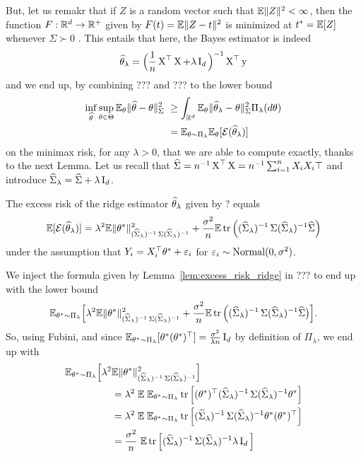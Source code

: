 But, let us remakr that if $Z$ is a random vector such that $\mathbb E \| Z \|^2 < \infty$, then the function $F : \mathbb R^d \rightarrow \mathbb R^+$ given by $F(t) = \mathbb E \| Z - t \|^2$ is minimized at $t^* = \mathbb E[Z]$ whenever $\Sigma \succ 0$
.
This entails that here, the Bayes estimator is indeed
\begin{equation*}
	\widehat \theta_\lambda = \Big( \frac 1n \operatorname{{\boldsymbol X}}^\top \operatorname{{\boldsymbol X}} + \lambda \operatorname{{\boldsymbol I}}_d\Big)^{-1} \operatorname{{\boldsymbol X}}^\top \operatorname{{\boldsymbol y}}
\end{equation*}
and we end up, by combining ??? and ??? to the lower bound 
\begin{align*}
	\inf_{\wh \theta} \sup_{\theta \in \Theta} \E_\theta \norm{\wh \theta - \theta}_{\bSigma}^2 &\geq 
	\int_{\R^d} \E_\theta \norm{\wh \theta_\lambda - \theta}_{\bSigma}^2 \Pi_\lambda(d \theta) \\
	&= \E_{\theta \sim \Pi_\lambda} \E_\theta [\cE(\wh \theta_\lambda)] 
\end{align*}
on the minimax risk, for any $\lambda > 0$, that we are able to compute exactly, thanks to the next Lemma.
Let us recall that $\widehat {\operatorname{\boldsymbol \Sigma}} = n^{-1} \operatorname{{\boldsymbol X}}^\top \operatorname{{\boldsymbol X}} = n^{-1} \sum_{i=1}^n X_i X_i\top$ and introduce $\widehat {\operatorname{\boldsymbol \Sigma}}_\lambda = \widehat {\operatorname{\boldsymbol \Sigma}} + \lambda \operatorname{{\boldsymbol I}}_d$.
\begin{lemma}
	\label{lem:excess_risk_ridge}
	The excess risk of the ridge estimator $\widehat \theta_\lambda$ given by ? equals
	\begin{equation*}
		\mathbb E [\operatorname{{\mathcal E}}(\widehat \theta_\lambda)] = \lambda^2 \mathbb E \| \theta^* \|_{(\widehat {\operatorname{\boldsymbol \Sigma}}_\lambda)^{-1} \operatorname{\boldsymbol \Sigma} (\widehat {\operatorname{\boldsymbol \Sigma}}_\lambda)^{-1}}^2 + \frac{\sigma^2}{n} \mathbb E \operatorname{tr} \Big( (\widehat {\operatorname{\boldsymbol \Sigma}}_\lambda)^{-1} \operatorname{\boldsymbol \Sigma} (\widehat {\operatorname{\boldsymbol \Sigma}}_\lambda)^{-1} \widehat {\operatorname{\boldsymbol \Sigma}} \Big)
	\end{equation*}
	under the assumption that $Y_i = X_i^\top \theta^* + \varepsilon_i$ for $\varepsilon_i \sim \operatorname{Normal}(0, \sigma^2)$.
\end{lemma}
We inject the formula given by Lemma~\ref{lem:excess_risk_ridge} in ??? to end up with the lower bound
\begin{equation*}
	\mathbb E_{\theta^* \sim \Pi_\lambda} \Big[ \lambda^2 \mathbb E \| \theta^* \|_{(\widehat {\operatorname{\boldsymbol \Sigma}}_\lambda)^{-1} \operatorname{\boldsymbol \Sigma} (\widehat {\operatorname{\boldsymbol \Sigma}}_\lambda)^{-1}}^2  + \frac{\sigma^2}{n} \mathbb E \operatorname{tr} \Big( (\widehat {\operatorname{\boldsymbol \Sigma}}_\lambda)^{-1} \operatorname{\boldsymbol \Sigma} (\widehat {\operatorname{\boldsymbol \Sigma}}_\lambda)^{-1} \widehat {\operatorname{\boldsymbol \Sigma}} \big) \Big].
\end{equation*}
So, using Fubini, and since $\mathbb E_{\theta^* \sim \Pi_\lambda} [\theta^* (\theta^*)^\top] = \frac{\sigma^2}{\lambda n} \operatorname{{\boldsymbol I}}_d$ by definition of $\Pi_\lambda$, we end up with
\begin{align*}
	\E_{\theta^* \sim \Pi_\lambda} \Big[ \lambda^2 & \E \norm{\theta^*}_{(\wh \bSigma_\lambda)^{-1} 
	\bSigma (\wh \bSigma_\lambda)^{-1}}^2 \Big] \\
	&= \lambda^2 \; \E \; \E_{\theta^* \sim \Pi_\lambda} \tr \Big[ (\theta^*)^\top (\wh \bSigma_\lambda)^{-1} \bSigma (\wh \bSigma_\lambda)^{-1} \theta^* \Big] \\
	&= \lambda^2 \; \E \; \E_{\theta^* \sim \Pi_\lambda} \tr \Big[(\wh \bSigma_\lambda)^{-1} \bSigma (\wh \bSigma_\lambda)^{-1} \theta^*  (\theta^*)^\top \Big] \\
	&= \frac{\sigma^2}{n} \; \E \tr \Big[(\wh \bSigma_\lambda)^{-1} \bSigma (\wh \bSigma_\lambda)^{-1}
	\lambda \bI_d \Big]
\end{align*}
